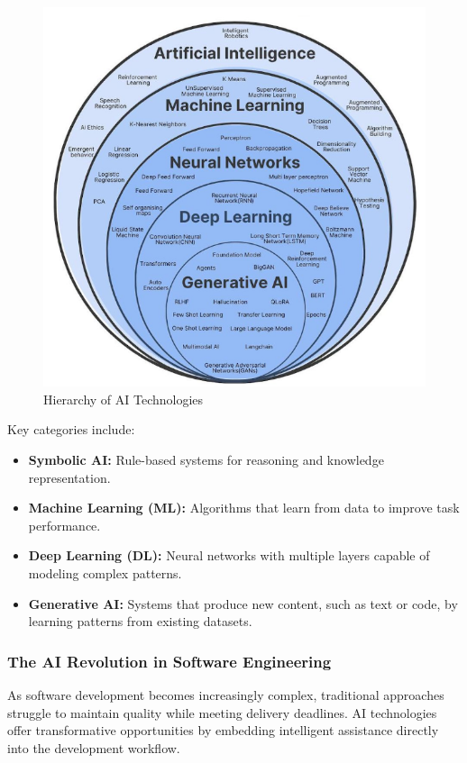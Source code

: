 \begin{spacing}{1.2}
\begin{figure}[H]
    \centering
    \includegraphics[scale=0.6]{Images/AI.png}
    \caption{Hierarchy of AI Technologies}
    \label{fig:ai_hierarchy}
\end{figure}

Key categories include:

\begin{itemize}
    \item \textbf{Symbolic AI:} Rule-based systems for reasoning and knowledge representation.
    \item \textbf{Machine Learning (ML):} Algorithms that learn from data to improve task performance.
    \item \textbf{Deep Learning (DL):} Neural networks with multiple layers capable of modeling complex patterns.
    \item \textbf{Generative AI:} Systems that produce new content, such as text or code, by learning patterns from existing datasets.
\end{itemize}

\subsubsection*{The AI Revolution in Software Engineering}
As software development becomes increasingly complex, traditional approaches struggle to maintain quality while meeting delivery deadlines. AI technologies offer transformative opportunities by embedding intelligent assistance directly into the development workflow.


\end{spacing}
